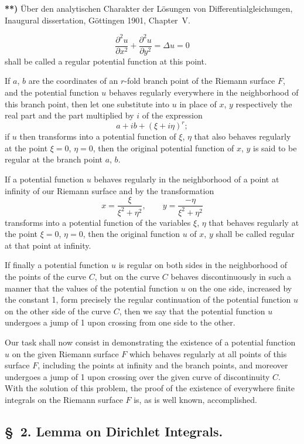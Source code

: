 \documentclass{article}
\begin{document}
\textbf{**)} Über den analytischen Charakter der Lösungen von Differentialgleichungen, Inaugural dissertation, Göttingen 1901, Chapter~V.

\[
\frac{\partial^2 u}{\partial x^2} + \frac{\partial^2 u}{\partial y^2} = \Delta u = 0
\]
shall be called a regular potential function at this point.

If $a$, $b$ are the coordinates of an $r$-fold branch point of the Riemann surface $F$, and the potential function $u$ behaves regularly everywhere in the neighborhood of this branch point, then let one substitute into $u$ in place of $x$, $y$ respectively the real part and the part multiplied by $i$ of the expression
\[
a + ib + (\xi + i\eta)^r;
\]
if $u$ then transforms into a potential function of $\xi$, $\eta$ that also behaves regularly at the point $\xi = 0$, $\eta = 0$, then the original potential function of $x$, $y$ is said to be regular at the branch point $a$, $b$.

If a potential function $u$ behaves regularly in the neighborhood of a point at infinity of our Riemann surface and by the transformation
\[
x = \frac{\xi}{\xi^2 + \eta^2}, \qquad y = \frac{-\eta}{\xi^2 + \eta^2}
\]
transforms into a potential function of the variables $\xi$, $\eta$ that behaves regularly at the point $\xi = 0$, $\eta = 0$, then the original function $u$ of $x$, $y$ shall be called regular at that point at infinity.

If finally a potential function $u$ is regular on both sides in the neighborhood of the points of the curve $C$, but on the curve $C$ behaves discontinuously in such a manner that the values of the potential function $u$ on the one side, increased by the constant 1, form precisely the regular continuation of the potential function $u$ on the other side of the curve $C$, then we say that the potential function $u$ undergoes a jump of 1 upon crossing from one side to the other.

Our task shall now consist in demonstrating the existence of a potential function $u$ on the given Riemann surface $F$ which behaves regularly at all points of this surface $F$, including the points at infinity and the branch points, and moreover undergoes a jump of 1 upon crossing over the given curve of discontinuity $C$. With the solution of this problem, the proof of the existence of everywhere finite integrals on the Riemann surface $F$ is, as is well known, accomplished.

\subsection*{§~2. Lemma on Dirichlet Integrals.}
\end{document}
